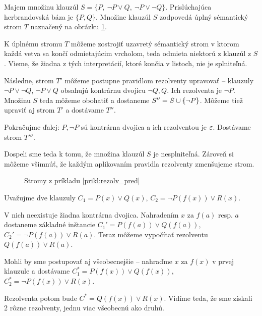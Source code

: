 \begin{priklad}
    \label{prikl:rezolv_pred}
    Majem množinu klauzúl 
    $S=\{P,\ \neg P\lor Q,\ \neg P \lor \neg Q\}$.
    Prislúchajúca herbrandovská báza je $\{P, Q\}$.
    Množine klauzúl $S$ zodpovedá úplný sémantický strom $T$
    naznačený na obrázku \ref{fig:rezolv_pred_prikl}. 
    
    K úplnému stromu $T$ môžeme zostrojiť uzavretý sémantický strom v ktorom
    každá vetva sa končí odmietajúcim vrcholom, teda odmieta niektorú
    z klauzúl z $S$.
    Vieme, že žiadna z tých interpretácií, ktoré končia v listoch, 
    nie je splniteľná. 

    Následne, strom $T'$ môžeme postupne pravidlom rezolventy
    upravovať -- klauzuly $\neg P \lor \neg Q$,
    $\neg P \lor Q$ obsahujú kontrárnu dvojicu $\neg Q,Q$.
    Ich rezolventa je $\neg P$. Množinu $S$ teda môžeme obohatiť a
    dostaneme $S''=S \cup \{ \neg P \}$. Môžeme tiež upraviť aj
    strom $T'$ a dostávame $T''$.

    Pokračujme ďalej: $P, \neg P$ sú kontrárna dvojica a ich
    rezolventou je $\varepsilon$. Dostávame strom $T'''$.

    Dospeli sme teda k tomu, že množina klauzúl $S$ je nesplniteľná.
    Zároveň si môžeme všimnúť, že každým aplikovaním pravidla
    rezolventy zmenšujeme strom.
    \begin{figure}
        \centering
        \vskip 1.5cm
        \caption{Stromy z príkladu \ref{prikl:rezolv_pred}}
        \label{fig:rezolv_pred_prikl}
    \end{figure}
\end{priklad}

\begin{priklad}
    Uvažujme dve klauzuly $C_1=P(x) \lor Q(x)$, 
    $C_2 = \neg P(f(x)) \lor R(x)$.

    V nich neexistuje žiadna kontrárna dvojica. Nahradením
    $x$ za $f(a)$ resp. $a$ 
    dostaneme základné inštancie
    $C_1'=P(f(a)) \lor Q(f(a))$, 
    $C_2'=\neg P(f(a)) \lor R(a)$.
    Teraz môžeme vypočítať rezolventu $Q(f(a)) \lor R(a)$.

    Mohli by sme postupovať aj všeobecnejšie -- nahraďme $x$ za $f(x)$ v
    prvej klauzule a dostávame
    $C_1^*= P(f(x)) \lor Q(f(x))$, $C_2^*= \neg P(f(x)) \lor R(x)$.

    Rezolventa potom bude $C^*= Q(f(x)) \lor R(x)$.
    Vidíme teda, že sme získali 2 rôzne rezolventy, jednu viac všeobecnú
    ako druhú.
\end{priklad}

